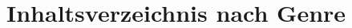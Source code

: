 \documentclass[a4paper, 10pt, twoside]{article}
\begin{document}
     

\pagebreak
\pagestyle{fancy}\fancyfoot{}
\section*{Inhaltsverzeichnis nach Genre}
\begin{multicols}{2}
\tableofcontents
\end{multicols}
\clearpage
\printindex
\clearpage




\fancyhf{}
\pagebreak

\end{document}
